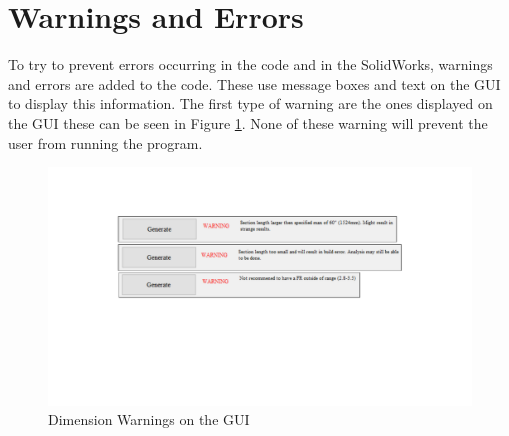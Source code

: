 \documentclass[../main.tex]{subfiles}
\begin{document}
\section{Warnings and Errors} \label{gui:error}
To try to prevent errors occurring in the code and in the SolidWorks, warnings and errors are added to the code. These use message boxes and text on the GUI to display this information. The first type of warning are the ones displayed on the GUI these can be seen in Figure \ref{fig:warningDimensions}. None of these warning will prevent the user from running the program.

\begin{figure}[H]
	\centering
	\includegraphics[width=0.9\linewidth]{img/gui/dimensionWarnings.pdf}
	\caption{Dimension Warnings on the GUI}
	\label{fig:warningDimensions}
\end{figure}
\end{document}
